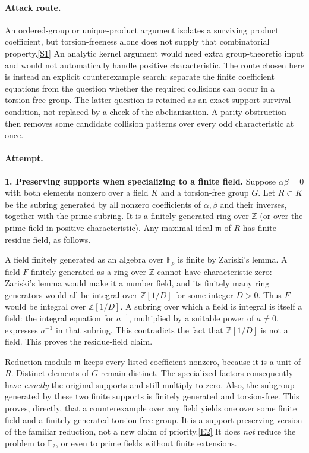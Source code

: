 \documentclass[11pt,a4paper]{article}
\newcommand{\Z}{\mathbb{Z}}
\newcommand{\F}{\mathbb{F}}
\newcommand{\sref}[2]{\hyperlink{source:#1:#2}{[S#2]}}
\newcommand{\eref}[2]{\hyperlink{extra:#1:#2}{[E#2]}}
\begin{document}
\paragraph{Attack route.}
An ordered-group or unique-product argument isolates a surviving product
coefficient, but torsion-freeness alone does not supply that combinatorial
property.\sref{30006789}{1}
An analytic kernel argument would need extra group-theoretic input and
would not automatically handle positive characteristic. The route chosen
here is instead an explicit counterexample search: separate the finite
coefficient equations from the question whether the required collisions
can occur in a torsion-free group. The latter question is retained as an
exact support-survival condition, not replaced by a check of the
abelianization. A parity obstruction then removes some candidate collision
patterns over every odd characteristic at once.

\paragraph{Attempt.}
\textbf{1. Preserving supports when specializing to a finite field.}
Suppose $\alpha\beta=0$ with both elements nonzero over a field $K$ and a
torsion-free group $G$. Let $R\subset K$ be the subring generated by all
nonzero coefficients of $\alpha,\beta$ and their inverses, together with
the prime subring. It is a finitely generated ring over $\Z$ (or over the
prime field in positive characteristic). Any maximal ideal $\mathfrak m$
of $R$ has finite residue field, as follows.

A field finitely generated as an algebra over $\F_p$ is finite by
Zariski's lemma. A field $F$ finitely generated as a ring over $\Z$ cannot
have characteristic zero: Zariski's lemma would make it a number field,
and its finitely many ring generators would all be integral over
$\Z[1/D]$ for some integer $D>0$. Thus $F$ would be integral over
$\Z[1/D]$. A subring over which a field is integral is itself a field:
the integral equation for $a^{-1}$, multiplied by a suitable power of
$a\ne0$, expresses $a^{-1}$ in that subring. This contradicts the fact
that $\Z[1/D]$ is not a field. This proves the residue-field claim.

Reduction modulo $\mathfrak m$ keeps every listed coefficient nonzero,
because it is a unit of $R$. Distinct elements of $G$ remain distinct.
The specialized factors consequently have \emph{exactly} the original
supports and still multiply to zero. Also, the subgroup generated by
these two finite supports is finitely generated and torsion-free.
This proves, directly, that a counterexample over any field yields one
over some finite field and a finitely generated torsion-free group.
It is a support-preserving version of the familiar reduction, not a new
claim of priority.\eref{30006789}{2}
It does \emph{not} reduce the problem to $\F_2$, or even to prime fields
without finite extensions.
\end{document}
